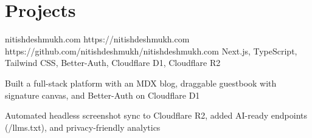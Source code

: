\section*{Projects}

\project
  {nitishdeshmukh.com}
  {https://nitishdeshmukh.com}
  {https://github.com/nitishdeshmukh/nitishdeshmukh.com}
  {Next.js, TypeScript, Tailwind CSS, Better-Auth, Cloudflare D1, Cloudflare R2}
  {
    \item Built a full-stack platform with an MDX blog, draggable guestbook with signature canvas, and Better-Auth on Cloudflare D1
    \item Automated headless screenshot sync to Cloudflare R2, added AI-ready endpoints (/llms.txt), and privacy-friendly analytics
  }
